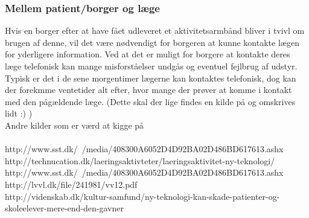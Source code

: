 \subsubsection{Mellem patient/borger og læge}
Hvis en borger efter at have fået udleveret et aktivitetsarmbånd bliver i tvivl om brugen af denne, vil det være nødvendigt for borgeren at kunne kontakte lægen for yderligere information. Ved at det er muligt for borgere at kontakte deres læge telefonisk kan mange misforståelser undgås og eventuel fejlbrug af udstyr. Typisk er det i de sene morgentimer lægerne kan kontaktes telefonisk, dog kan der forekmme ventetider alt efter, hvor mange der prøver at komme i kontakt med den pågældende læge.  (Dette skal der lige findes en kilde på og omskrives lidt :) ) \\


Andre kilder som er værd at kigge på \\\\

http://www.sst.dk/~/media/408300A6052D4D92BA02D486BD617613.ashx \\
http://technucation.dk/laeringsaktivteter/laeringsaktivitet-ny-teknologi/ \\
http://www.sst.dk/~/media/408300A6052D4D92BA02D486BD617613.ashx \\
http://lvvl.dk/file/241981/vv12.pdf \\

http://videnskab.dk/kultur-samfund/ny-teknologi-kan-skade-patienter-og-skoleelever-mere-end-den-gavner

